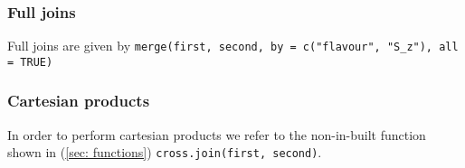 \subsubsection*{Full joins}
Full joins are given by
\texttt{merge(first, second, by = c("flavour", "S\_z"), 
all = TRUE)}

\subsubsection*{Cartesian products}
In order to perform cartesian products 
we refer to the non-in-built function 
shown in (\ref{sec: functions}) 
\texttt{cross.join(first, second)}.


